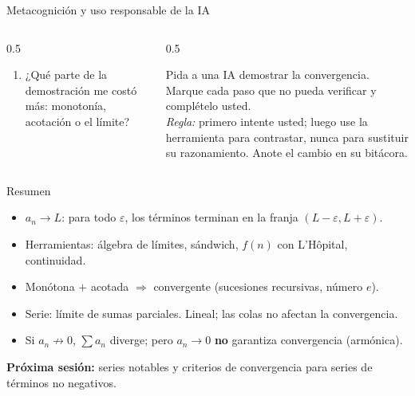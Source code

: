 \documentclass[10pt,aspectratio=169]{beamer}
\begin{document}
\begin{frame}{Metacognición y uso responsable de la IA}
  \small
  \begin{columns}[t]
    \begin{column}{0.5\textwidth}
      \begin{metacog}
        \begin{enumerate}
          \metacomun
          \item ¿Qué parte de la demostración me costó más: monotonía, acotación o el límite?
        \end{enumerate}
      \end{metacog}
    \end{column}
    \begin{column}{0.5\textwidth}
      \begin{iabox}
        Pida a una IA demostrar la convergencia. Marque cada paso que no pueda verificar y complételo usted.\\[2pt]
        \textit{Regla:} primero intente usted; luego use la herramienta para contrastar, nunca para sustituir su razonamiento. Anote el cambio en su bitácora.
      \end{iabox}
    \end{column}
  \end{columns}
\end{frame}

\begin{frame}{Resumen}
  \begin{itemize}
    \item $a_n\to L$: para todo $\varepsilon$, los términos terminan en la franja $(L-\varepsilon,L+\varepsilon)$.
    \item Herramientas: álgebra de límites, sándwich, $f(n)$ con L'Hôpital, continuidad.
    \item Monótona $+$ acotada $\Rightarrow$ convergente (sucesiones recursivas, número $e$).
    \item Serie: límite de sumas parciales. Lineal; las colas no afectan la convergencia.
    \item Si $a_n\not\to0$, $\sum a_n$ diverge; pero $a_n\to0$ \textbf{no} garantiza convergencia (armónica).
  \end{itemize}
  \vspace{3mm}
  \textbf{Próxima sesión:} series notables y criterios de convergencia para series de términos no negativos.
\end{frame}
\end{document}
